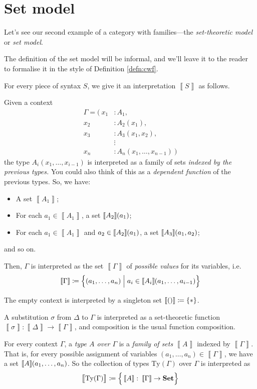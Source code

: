 \documentclass{article}
\theoremstyle{definition}
\renewcommand{\int}[1]
    {\left\llbracket #1 \right\rrbracket}       %
\newcommand{\emp}{()}%
\newcommand{\Set}{\mathbf{Set}}
\newcommand{\Ty}{\mathrm{Ty}}
\newcommand{\defeq}{
	\mathrel{\mathrel{\mathop:}\mkern-1.2mu=}}	%
\newcommand{\n}{\hspace{-0.2em}}                %
\begin{document}
\section{Set model}

Let's see our second example of a category with families---the \textit{set-theoretic model} or \textit{set model}.

The definition of the set model will be informal, and we'll leave it to the reader to formalise it in the style of Definition \ref{defn:cwf}.

For every piece of syntax $S$, we give it an interpretation $\int{S}$ as follows.

Given a context\vspace{-7mm}
\begin{align*}
    \Gamma = \big(\
    x_1 &: A_1,\\
    x_2 &: A_2(x_1),\\
    x_3 &: A_3(x_1,x_2),\\
    &\mathrel{\vdots}\\
    x_n &: A_n(x_1,\ldots,x_{n-1})\ \big)
\end{align*}
the type $A_i(x_1,\ldots,x_{i-1})$ is interpreted as a family of sets \textit{indexed by the previous types.} You could also think of this as a \textit{dependent function} of the previous types. So, we have:
\begin{itemize}
    \item A set $\int{A_1}$;
    
    \item For each $a_1 \in \int{A_1}$, a set $\int{A_2}\n(a_1)$;
    
    \item For each $a_1 \in \int{A_1}$ and $a_2 \in \int{A_2}\n(a_1)$, a set $\int{A_3}\n(a_1,a_2)$;
\end{itemize}
and so on.

Then, $\Gamma$ is interpreted as the set $\int{\Gamma}$ of \textit{possible values} for its variables, i.e. $$\int{\Gamma} \defeq \Big\{ (a_1,\ldots,a_n) \mathrel{\Big|} a_i \in \int{A_i}\n(a_1,\ldots,a_{i-1}) \Big\}$$

The empty context is interpreted by a singleton set $\int{\emp} \defeq \{ * \}$.

A substitution $\sigma$ from $\Delta$ to $\Gamma$ is interpreted as a set-theoretic function $\int{\sigma}\colon \int{\Delta} \to \int{\Gamma}$, and composition is the usual function composition.

For every context $\Gamma$, a \textit{type $A$ over $\Gamma$} is a \textit{family of sets} $\int{A}$ indexed by $\int{\Gamma}$. That is, for every possible assignment of variables $(a_1,\ldots,a_n) \in \int{\Gamma}$, we have a set $\int{A}\n(a_1,\ldots,a_n)$. So the collection of types $\Ty(\Gamma)$ over $\Gamma$ is interpreted as $$\int{\big.\Ty(\Gamma)} \defeq \Big\{ \int{A}\colon \int{\Gamma} \to \Set \Big\}$$
\end{document}
